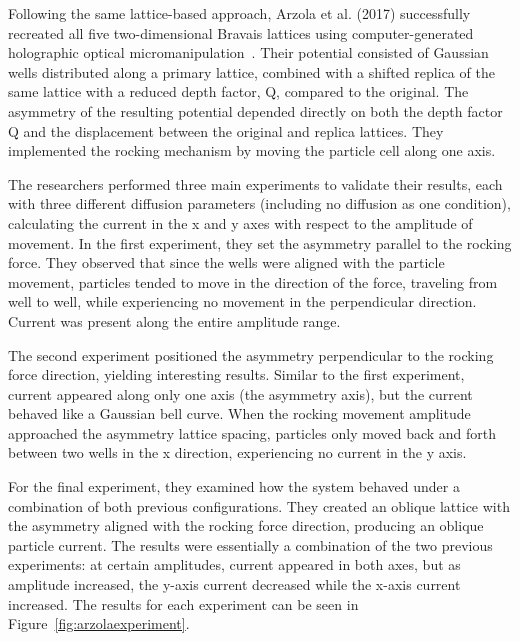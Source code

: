  Following the same lattice-based approach, Arzola et al. (2017) successfully recreated all five two-dimensional Bravais lattices using computer-generated holographic optical micromanipulation~\cite{arzola2017omnidirectional}. Their potential consisted of Gaussian wells distributed along a primary lattice, combined with a shifted replica of the same lattice with a reduced depth factor, Q, compared to the original. The asymmetry of the resulting potential depended directly on both the depth factor Q and the displacement between the original and replica lattices. They implemented the rocking mechanism by moving the particle cell along one axis.

The researchers performed three main experiments to validate their results, each with three different diffusion parameters (including no diffusion as one condition), calculating the current in the x and y axes with respect to the amplitude of movement. In the first experiment, they set the asymmetry parallel to the rocking force. They observed that since the wells were aligned with the particle movement, particles tended to move in the direction of the force, traveling from well to well, while experiencing no movement in the perpendicular direction. Current was present along the entire amplitude range.

The second experiment positioned the asymmetry perpendicular to the rocking force direction, yielding interesting results. Similar to the first experiment, current appeared along only one axis (the asymmetry axis), but the current behaved like a Gaussian bell curve. When the rocking movement amplitude approached the asymmetry lattice spacing, particles only moved back and forth between two wells in the x direction, experiencing no current in the y axis.

For the final experiment, they examined how the system behaved under a combination of both previous configurations. They created an oblique lattice with the asymmetry aligned with the rocking force direction, producing an oblique particle current. The results were essentially a combination of the two previous experiments: at certain amplitudes, current appeared in both axes, but as amplitude increased, the y-axis current decreased while the x-axis current increased. The results for each experiment can be seen in Figure~\ref{fig:arzolaexperiment}.

